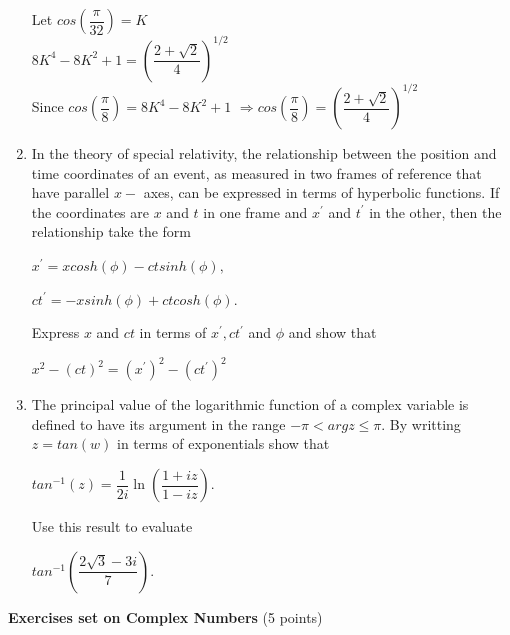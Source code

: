 \documentclass[fleqn]{article}
\begin{document}
\begin{enumerate}
    \textcolor{hwColor}{
      Let $cos(\dfrac{\pi}{32})=K$ \\
      $8K^4-8K^2+1=(\dfrac{2+\sqrt{2}}{4})^{1/2}$ \\
      Since $cos(\dfrac{\pi}{8})=8K^4-8K^2+1$ $\Longrightarrow cos(\dfrac{\pi}{8})=(\dfrac{2+\sqrt{2}}{4})^{1/2}$  \\
    }

  
  \item  In the theory of special relativity, the relationship between the position and time coordinates of an event, as measured in two frames of reference that have parallel $x-$ axes, can be expressed in terms of hyperbolic functions. If the coordinates are $x$ and $t$ in one frame and $x^\prime$ and $t^\prime$ in the other, then the relationship take the form
  
  $x^\prime=x cosh(\phi)-ct sinh(\phi),$
  
  $ct^\prime=-xsinh(\phi)+ct cosh(\phi)$.

  Express $x$ and $ct$ in terms of $x^\prime, ct^\prime$ and $\phi$ and show that 

  $x^2-(ct)^2=(x^\prime)^2-(ct^\prime)^2$
  
  \item The principal value of the logarithmic function of a complex variable is defined to have its argument in the range $-\pi < arg z\leq \pi $. By writting $z=tan(w)$ in terms of exponentials show that

  $tan^{-1}(z)=\dfrac{1}{2i} \ln(\dfrac{1+iz}{1-iz})$.

  Use this result to evaluate

  $tan^{-1}(\dfrac{2\sqrt{3}-3i}{7})$.
  
\end{enumerate}


\pagebreak

\textbf{Exercises set on Complex Numbers} (5 points)
\end{document}

